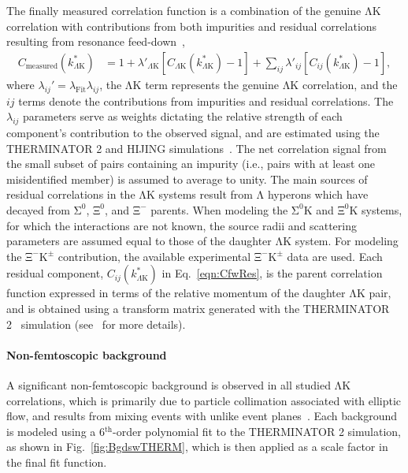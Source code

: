 \documentclass{svproc}
\newcommand{\Lam}{$\mathrm{\Lambda}$\xspace}
\newcommand{\LamK}{$\mathrm{\Lambda}\mathrm{K}$\xspace}
\newcommand{\XiKpm}{$\mathrm{\Xi}^{-}\mathrm{K^{\pm}}$\xspace}
\begin{document}
The finally measured correlation function is a combination of the genuine \LamK correlation with contributions from both impurities and residual correlations resulting from resonance feed-down~\cite{Kisiel:2014mma},
\begin{equation}
\begin{aligned}
\label{eqn:CfwRes} 
 C_{\mathrm{measured}}(k^{*}_{\Lambda\mathrm{K}}) &= 1 + \lambda'_{\Lambda\mathrm{K}}[C_{\Lambda\mathrm{K}}(k^{*}_{\Lambda\mathrm{K}}) - 1] + \sum\limits_{ij}  \lambda'_{ij}[C_{ij}(k^{*}_{\Lambda\mathrm{K}})-1],
\end{aligned} 
\end{equation}
where $\lambda_{ij}' = \lambda_{\mathrm{Fit}}\lambda_{ij}$, the \LamK term represents the genuine \LamK correlation, and the $ij$ terms denote the contributions from impurities and residual correlations.
The $\lambda_{ij}$ parameters serve as weights dictating the relative strength of each component's contribution to the observed signal, and are estimated using the THERMINATOR 2 and HIJING simulations~\cite{Kisiel:2014mma,Acharya:2018gyz}.
The net correlation signal from the small subset of pairs containing an impurity (i.e., pairs with at least one misidentified member) is assumed to average to unity.
The main sources of residual correlations in the \LamK systems result from \Lam hyperons which have decayed from $\mathrm{\Sigma}^{0}$, $\mathrm{\Xi}^{0}$, and $\mathrm{\Xi}^{-}$ parents.
When modeling the $\mathrm{\Sigma}^{0}$K and $\mathrm{\Xi}^{0}$K systems, for which the interactions are not known, the source radii and scattering parameters are assumed equal to those of the daughter \LamK system.
For modeling the \XiKpm contribution, the available experimental \XiKpm data are used.
Each residual component, $C_{ij}(k^{*}_{\Lambda\mathrm{K}})$ in Eq.~\ref{eqn:CfwRes}, is the parent correlation function expressed in terms of the relative momentum of the daughter \LamK pair, and is obtained using a transform matrix generated with the THERMINATOR 2~\cite{Chojnacki:2011hb} simulation (see~\cite{Kisiel:2014mma} for more details).



\paragraph{Non-femtoscopic background}
\label{NonFlatBackground}


A significant non-femtoscopic background is observed in all studied \LamK correlations, which is primarily due to particle collimation associated with elliptic flow, and results from mixing events with unlike event planes~\cite{Kisiel:2017}.
Each background is modeled using a 6$^{\mathrm{th}}$-order polynomial fit to the THERMINATOR 2 simulation, as shown in Fig.~\ref{fig:BgdswTHERM}, which is then applied as a scale factor in the final fit function.
\end{document}
